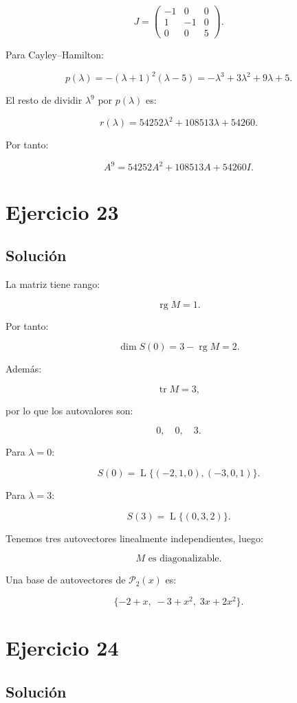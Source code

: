 \documentclass[11pt,a4paper]{article}
\newcommand{\rg}{\operatorname{rg}}
\newcommand{\tr}{\operatorname{tr}}
\newcommand{\Span}{\operatorname{L}}
\begin{document}
\[
\boxed{
J=
\begin{pmatrix}
-1&0&0\\
1&-1&0\\
0&0&5
\end{pmatrix}.
}
\]

Para Cayley--Hamilton:

\[
p(\lambda)
=
-(\lambda+1)^2(\lambda-5)
=
-\lambda^3+3\lambda^2+9\lambda+5.
\]

El resto de dividir $\lambda^9$ por $p(\lambda)$ es:

\[
r(\lambda)
=
54252\lambda^2
+
108513\lambda
+
54260.
\]

Por tanto:

\[
\boxed{
A^9
=
54252A^2
+
108513A
+
54260I.
}
\]

\section{Ejercicio 23}
\subsection{Solución}

La matriz tiene rango:

\[
\rg M=1.
\]

Por tanto:

\[
\dim S(0)
=
3-\rg M
=
2.
\]

Además:

\[
\tr M=3,
\]

por lo que los autovalores son:

\[
0,\quad0,\quad3.
\]

Para $\lambda=0$:

\[
S(0)
=
\Span\{(-2,1,0),(-3,0,1)\}.
\]

Para $\lambda=3$:

\[
S(3)
=
\Span\{(0,3,2)\}.
\]

Tenemos tres autovectores linealmente independientes, luego:

\[
\boxed{
M\text{ es diagonalizable.}
}
\]

Una base de autovectores de $\mathcal P_2(x)$ es:

\[
\boxed{
\{-2+x,\;-3+x^2,\;3x+2x^2\}.
}
\]

\section{Ejercicio 24}
\subsection{Solución}
\end{document}
